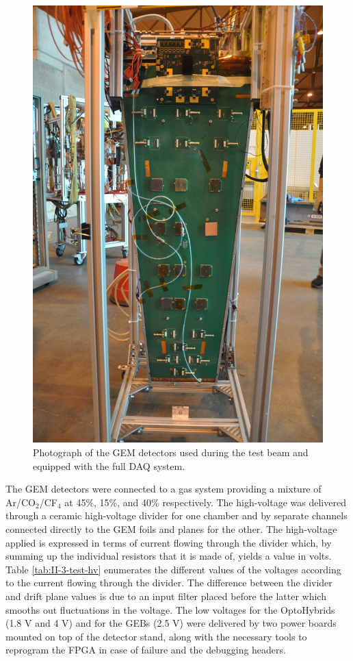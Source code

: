       \begin{figure}[p!]
        \centering
        \includegraphics[width=\textwidth]{img/II-3-test-beam/test-geb.jpg}
        \caption{Photograph of the GEM detectors used during the test beam and equipped with the full DAQ system.}
        \label{fig:II-3-test-geb}
      \end{figure}

      The GEM detectors were connected to a gas system providing a mixture of Ar/CO$_2$/CF$_4$ at 45\%, 15\%, and 40\% respectively. The high-voltage was delivered through a ceramic high-voltage divider for one chamber and by separate channels connected directly to the GEM foils and planes for the other. The high-voltage applied is expressed in terms of current flowing through the divider which, by summing up the individual resistors that it is made of, yields a value in volts. Table \ref{tab:II-3-test-hv} enumerates the different values of the voltages according to the current flowing through the divider. The difference between the divider and drift plane values is due to an input filter placed before the latter which smooths out fluctuations in the voltage. The low voltages for the OptoHybrids (1.8 V and 4 V) and for the GEBs (2.5 V) were delivered by two power boards mounted on top of the detector stand, along with the necessary tools to reprogram the FPGA in case of failure and the debugging headers.

